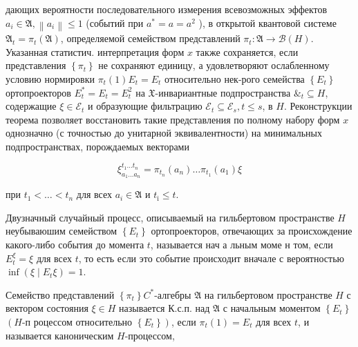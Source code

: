 \documentclass[10pt]{article}
\begin{document}
дающих вероятности последовательного измерения всевозможных эффектов $a_{i} \in \mathfrak{A},\left\|a_{i}\right\| \leqslant 1$ (событий при $a^{*}=a=a^{2}$ ), в открытой квантовой системе $\mathfrak{A}_{t}=\pi_{t}(\mathfrak{A})$, определяемой семейством представлений $\pi_{t}: \mathfrak{A} \rightarrow \mathscr{B}(H)$. Указанная статистич. интерпретация форм $x$ также сохраняется, если представления $\left\{\pi_{t}\right\}$ не сохраняют единицу, а удовлетворяют ослабленному условию нормировки $\pi_{t}(1) E_{t}=E_{t}$ относительно нек-рого семейства $\left\{E_{t}\right\}$ ортопроекторов $E_{t}^{*}=E_{t}=E_{t}^{2}$ на $\mathfrak{X}$-инвариантные подпространства $\mathscr{\&}_{t} \subseteq H$, содержащие $\xi \in \mathscr{E}_{t}$ и образующие фильтрацию $\mathscr{E}_{t} \subseteq \mathscr{E}_{s}, t \leqslant s$, в $H$. Реконструкции теорема позволяет восстановить такие представления по полному набору форм $x$ однозначно (с точностью до унитарной эквивалентности) на минимальных подпространствах, порождаемых векторами



\[

\xi_{a_{1} \ldots a_{n}}^{t_{1} \ldots t_{n}}=\pi_{t_{n}}\left(a_{n}\right) \ldots \pi_{t_{1}}\left(a_{1}\right) \xi

\]



при $t_{1}<\ldots<t_{n}$ для всех $a_{i} \in \mathfrak{A}$ и $t_{\mathrm{i}} \leqslant t$.



Двузначный случайный процесс, описываемый на гильбертовом пространстве $H$ неубываюшим семейством $\left\{E_{t}\right\}$ ортопроекторов, отвечающих за происхождение какого-либо события до момента $t$, называется нач а льным моме н том, если $E_{t}^{\xi}=\xi$ для всех $t$, то есть если это событие происходит вначале с вероятностью $\inf \left(\xi \mid E_{t} \xi\right)=1$.



Семейство представлений $\left\{\pi_{t}\right\} C^{*}$-алгебры $\mathfrak{A}$ на гильбертовом пространстве $H$ с вектором состояния $\xi \in H$ называется К.с.п. над $\mathfrak{A}$ с начальным моментом $\left\{E_{t}\right\}$ $\left(H\right.$-п роцессом относительно $\left.\left\{E_{t}\right\}\right)$, если $\pi_{t}(1)=E_{t}$ для всех $t$, и называется каноническим $H$-процессом,
\end{document}
